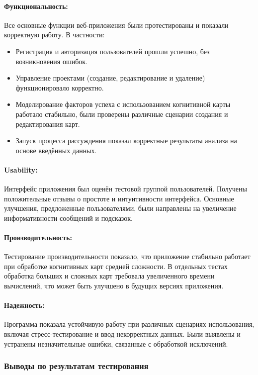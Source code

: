 \documentclass{article}
\begin{document}
    \paragraph{Функциональность:}
    Все основные функции веб-приложения были протестированы и показали корректную работу. В частности:
    \begin{itemize}
        \item Регистрация и авторизация пользователей прошли успешно, без возникновения ошибок.
        \item Управление проектами (создание, редактирование и удаление) функционировало корректно.
        \item Моделирование факторов успеха с использованием когнитивной карты работало стабильно, были проверены различные сценарии создания и редактирования карт.
        \item Запуск процесса рассуждения показал корректные результаты анализа на основе введённых данных.
    \end{itemize}

    \paragraph{Usability:}
    Интерфейс приложения был оценён тестовой группой пользователей. Получены положительные отзывы о простоте и интуитивности интерфейса. Основные улучшения, предложенные пользователями, были направлены на увеличение информативности сообщений и подсказок.

    \paragraph{Производительность:}
    Тестирование производительности показало, что приложение стабильно работает при обработке когнитивных карт средней сложности. В отдельных тестах обработка больших и сложных карт требовала увеличенного времени вычислений, что может быть улучшено в будущих версиях приложения.

    \paragraph{Надежность:}
    Программа показала устойчивую работу при различных сценариях использования, включая стресс-тестирование и ввод некорректных данных. Были выявлены и устранены незначительные ошибки, связанные с обработкой исключений.

    \subsubsection{Выводы по результатам тестирования}
\end{document}
